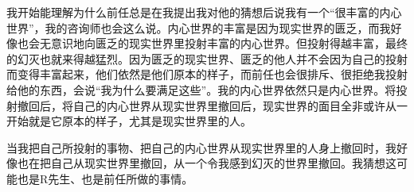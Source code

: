 我开始能理解为什么前任总是在我提出我对他的猜想后说我有一个“很丰富的内心世界”，我的咨询师也会这么说。内心世界的丰富是因为现实世界的匮乏，而我好像也会无意识地向匮乏的现实世界里投射丰富的内心世界。但投射得越丰富，最终的幻灭也就来得越猛烈。因为匮乏的现实世界、匮乏的他人并不会因为自己的投射而变得丰富起来，他们依然是他们原本的样子，而前任也会很排斥、很拒绝我投射给他的东西，会说“我为什么要满足这些”。我的内心世界依然只是内心世界。将投射撤回后，将自己的内心世界从现实世界里撤回后，现实世界的面目全非或许从一开始就是它原本的样子，尤其是现实世界里的人。

当我把自己所投射的事物、把自己的内心世界从现实世界里的人身上撤回时，我好像也在把自己从现实世界里撤回，从一个令我感到幻灭的世界里撤回。我猜想这可能也是R先生、也是前任所做的事情。

